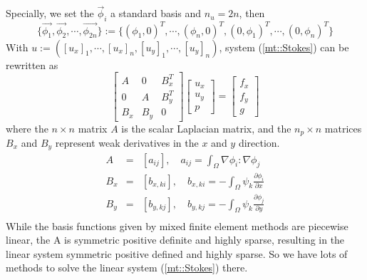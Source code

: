 \documentclass[a4paper]{article}
\begin{document}
Specially, we set the {$\vec{\phi}_i$} a standard basis and $n_u = 2n$, then
\begin{equation}
\{\vec{\phi_1},\vec{\phi_2},\cdots,\vec{\phi_{2n}} \}:=\{(\phi_1,0)^T,\cdots,(\phi_n,0)^T,(0,\phi_1)^T,\cdots,(0,\phi_n)^T\}
\label{eq::basisfunction}
\end{equation}
With $u:=([u_x]_1,\cdots,[u_x]_n,[u_y]_1,\cdots,[u_y]_n)$, system (\ref{mt::Stokes}) can be rewritten as
\begin{equation}
\left[ \begin{array}{ccc}
A & 0 & B_x^T \\
0 & A & B_y^T \\
B_x & B_y & 0
\end{array}
\right]
\left[\begin{array}{ccc}
u_x\\
u_y\\
p
\end{array}
\right]=
\left[\begin{array}{ccc}
f_x\\
f_y\\
g
\end{array}
\right]
\label{Stokes}
\end{equation}
where the $n\times n$ matrix $A$ is the scalar Laplacian matrix, and the $n_p\times n$ matrices $B_x$ and $B_y$ represent weak derivatives in the $x$ and $y$ direction. 	
\begin{equation}
\begin{array}{rcl}
A &=& [a_{ij}], \quad a_{ij} = \int_{\Omega} \nabla \phi_i : \nabla \phi_j \\
B_x &=& [b_{x,ki}], \quad b_{x,ki} = -\int_{\Omega} \psi_k \frac{\partial \phi_i}{\partial x} \\
B_y &=& [b_{y,kj}], \quad b_{y,kj} = -\int_{\Omega} \psi_k \frac{\partial \phi_j}{\partial y} \\
\end{array}
\label{Stokes-mtvalue}
\end{equation}
While the basis functions given by mixed finite element methods are piecewise linear, the A is symmetric positive definite and highly sparse, resulting in the linear system symmetric positive defined and highly sparse. So we have lots of methods to solve the linear system (\ref{mt::Stokes}) there. \\
\end{document}
